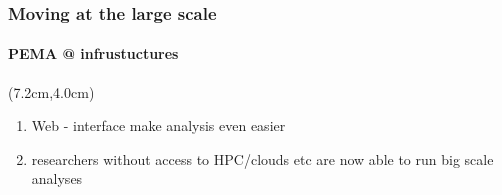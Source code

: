 \documentclass{beamer}
\begin{document}
   \begin{frame}
      \frametitle{Moving at the large scale}
      \framesubtitle{PEMA @ infrustuctures}
      \begin{singlespace}

         \begin{textblock*}{5cm}(7.2cm,4.0cm) %
            

            \begin{enumerate}
               \item Web - interface make analysis even easier
               \item researchers without access to HPC/clouds etc are now able to run big scale analyses
            \end{enumerate}

         \end{textblock*}
         \end{singlespace}
   \end{frame}
\end{document}
